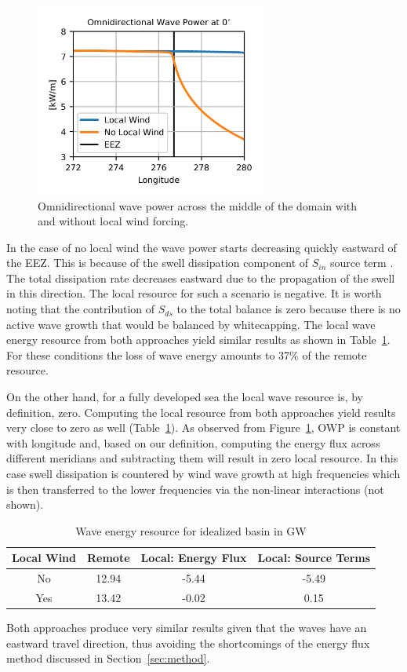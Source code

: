 \begin{figure}[ht]
  \centering
  \includegraphics[width=3in]{../diagram/appendixB_Figure2.png}
  \caption{Omnidirectional wave power across the middle of the domain with and without local wind forcing.}
  \label{fig:idealizedOWP}
\end{figure}

In the case of no local wind the wave power starts decreasing quickly eastward of the EEZ. This is because of the swell dissipation component of $S_{in}$ source term \citep{ardhuinObservationSwellDissipation2009}. The total dissipation rate decreases eastward due to the propagation of the swell in this direction. The local resource for such a scenario is negative. It is worth noting that the contribution of $S_{ds}$ to the total balance is zero because there is no active wave growth that would be balanced by whitecapping. The local wave energy resource from both approaches yield similar results as shown in Table~\ref{table:idealizedResource}. For these conditions the loss of wave energy amounts to 37\% of the remote resource. 

On the other hand, for a fully developed sea the local wave resource is, by definition, zero. Computing the local resource from both approaches yield results very close to zero as well (Table~\ref{table:idealizedResource}). As observed from Figure~\ref{fig:idealizedOWP}, OWP is constant with longitude and, based on our definition, computing the energy flux across different meridians and subtracting them will result in zero local resource. In this case swell dissipation is countered by wind wave growth at high frequencies which is then transferred to the lower frequencies via the non-linear interactions (not shown).

\begin{table}[ht]
  \centering
  \begin{tabular}{c|ccc}
    \hline
    Local Wind & Remote & Local: Energy Flux & Local: Source Terms \\
    \hline
    No  & 12.94 & -5.44 & -5.49 \\
    Yes & 13.42 & -0.02 &  0.15 \\
\hline
  \end{tabular}
  \caption{Wave energy resource for idealized basin in GW}
  \label{table:idealizedResource}
\end{table}

Both approaches produce very similar results given that the waves have an eastward travel direction, thus avoiding the shortcomings of the energy flux method discussed in Section~\ref{sec:method}.
